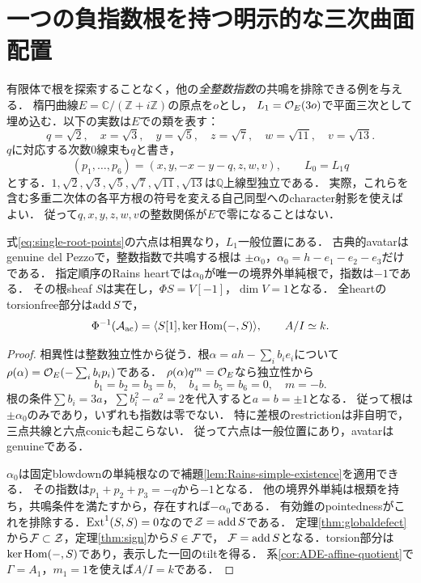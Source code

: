 \section{一つの負指数根を持つ明示的な三次曲面配置}\label{sec:single-root}
有限体で根を探索することなく，他の\emph{全整数指数}の共鳴を排除できる例を与える．
楕円曲線$E=\mathbb C/(\mathbb Z+i\mathbb Z)$の原点を$o$とし，
$L_1=\mathcal O_E(3o)$で平面三次として埋め込む．以下の実数は$E$での類を表す：
\[
 q=\sqrt2,\quad x=\sqrt3,\quad y=\sqrt5,
 \quad z=\sqrt7,\quad w=\sqrt{11},\quad v=\sqrt{13}.
\]
$q$に対応する次数0線束も$q$と書き，
\begin{equation}\label{eq:single-root-points}
 (p_1,\ldots,p_6)=(x,y,-x-y-q,z,w,v),\qquad L_0=L_1q
\end{equation}
とする．$1,\sqrt2,\sqrt3,\sqrt5,\sqrt7,\sqrt{11},\sqrt{13}$は$\mathbb Q$上線型独立である．
実際，これらを含む多重二次体の各平方根の符号を変える自己同型へのcharacter射影を使えばよい．
従って$q,x,y,z,w,v$の整数関係が$E$で零になることはない．

\begin{proposition}[共鳴根の完全な排除と一回のtilt]\label{prop:single-root-complete}
式\eqref{eq:single-root-points}の六点は相異なり，$L_1$一般位置にある．
古典的avatarはgenuine del Pezzoで，整数指数で共鳴する根は
$\pm\alpha_0$，$\alpha_0=h-e_1-e_2-e_3$だけである．
指定順序のRains heartでは$\alpha_0$が唯一の境界外単純根で，指数は$-1$である．
その根sheaf $S$は実在し，$\Phi S=V[-1]$，$\dim V=1$となる．
全heartのtorsionfree部分は$\operatorname{add} S$で，
\[
 \Phi^{-1}(\mathcal A_{\mathrm{ac}})=\langle S[1],\ker\operatorname{Hom}(-,S)\rangle,
 \qquad A/I\simeq k.
\]
\end{proposition}
\begin{proof}
相異性は整数独立性から従う．根$\alpha=ah-\sum_i b_ie_i$について
$\rho(\alpha)=\mathcal O_E(-\sum_i b_ip_i)$である．
$\rho(\alpha)q^m=\mathcal O_E$なら独立性から
\[
 b_1=b_2=b_3=b,\quad b_4=b_5=b_6=0,\quad m=-b.
\]
根の条件$\sum b_i=3a$，$\sum b_i^2-a^2=2$を代入すると$a=b=\pm1$となる．
従って根は$\pm\alpha_0$のみであり，いずれも指数は零でない．
特に差根のrestrictionは非自明で，三点共線と六点conicも起こらない．
従って六点は一般位置にあり，avatarはgenuineである．

$\alpha_0$は固定blowdownの単純根なので補題\ref{lem:Rains-simple-existence}を適用できる．
その指数は$p_1+p_2+p_3=-q$から$-1$となる．
他の境界外単純は根類を持ち，共鳴条件を満たすから，存在すれば$-\alpha_0$である．
有効錐のpointednessがこれを排除する．$\operatorname{Ext}^1(S,S)=0$なので$\mathcal Z=\operatorname{add} S$である．
定理\ref{thm:globaldefect}から$\mathcal F\subset\mathcal Z$，定理\ref{thm:sign}から$S\in\mathcal F$で，
$\mathcal F=\operatorname{add} S$となる．torsion部分は$\ker\operatorname{Hom}(-,S)$であり，表示した一回のtiltを得る．
系\ref{cor:ADE-affine-quotient}で$\Gamma=A_1$，$m_1=1$を使えば$A/I=k$である．
\end{proof}

